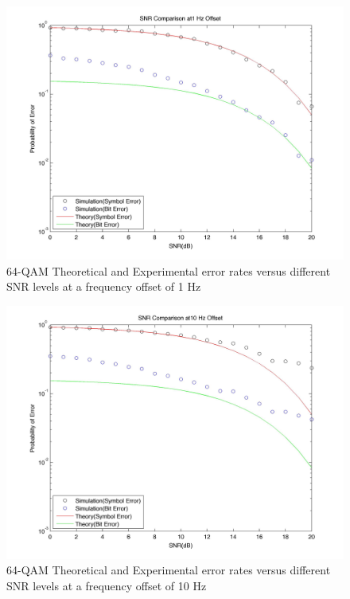 \documentclass[]{article}
\begin{document}
\begin{figure}[H]
\centering
\hspace*{-2cm}\includegraphics[width=1.3\textwidth]{qam64SNRfo3.jpg}
\caption{64-QAM Theoretical and Experimental error rates versus different SNR levels at a frequency offset of 1 Hz}
\end{figure}

\begin{figure}[H]
\centering
\hspace*{-2cm}\includegraphics[width=1.3\textwidth]{qam64SNRfo4.jpg}
\caption{64-QAM Theoretical and Experimental error rates versus different SNR levels at a frequency offset of 10 Hz}
\end{figure}
\end{document}
